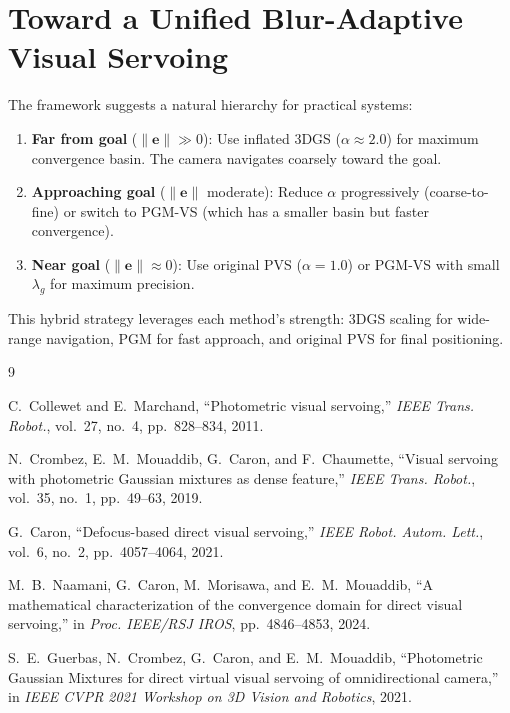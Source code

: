 \documentclass[11pt]{article}
\begin{document}
\section{Toward a Unified Blur-Adaptive Visual Servoing}

The framework suggests a natural hierarchy for practical systems:

\begin{enumerate}
    \item \textbf{Far from goal} ($\|\mathbf{e}\| \gg 0$): Use inflated 3DGS ($\alpha \approx 2.0$) for maximum convergence basin. The camera navigates coarsely toward the goal.

    \item \textbf{Approaching goal} ($\|\mathbf{e}\|$ moderate): Reduce $\alpha$ progressively (coarse-to-fine) or switch to PGM-VS (which has a smaller basin but faster convergence).

    \item \textbf{Near goal} ($\|\mathbf{e}\| \approx 0$): Use original PVS ($\alpha = 1.0$) or PGM-VS with small $\lambda_g$ for maximum precision.
\end{enumerate}

This hybrid strategy leverages each method's strength: 3DGS scaling for wide-range navigation, PGM for fast approach, and original PVS for final positioning.


\begin{thebibliography}{9}

C.~Collewet and E.~Marchand,
``Photometric visual servoing,''
\emph{IEEE Trans. Robot.}, vol.~27, no.~4, pp.~828--834, 2011.

N.~Crombez, E.~M.~Mouaddib, G.~Caron, and F.~Chaumette,
``Visual servoing with photometric Gaussian mixtures as dense feature,''
\emph{IEEE Trans. Robot.}, vol.~35, no.~1, pp.~49--63, 2019.

G.~Caron,
``Defocus-based direct visual servoing,''
\emph{IEEE Robot. Autom. Lett.}, vol.~6, no.~2, pp.~4057--4064, 2021.

M.~B.~Naamani, G.~Caron, M.~Morisawa, and E.~M.~Mouaddib,
``A mathematical characterization of the convergence domain for direct visual servoing,''
in \emph{Proc. IEEE/RSJ IROS}, pp.~4846--4853, 2024.

S.~E.~Guerbas, N.~Crombez, G.~Caron, and E.~M.~Mouaddib,
``Photometric Gaussian Mixtures for direct virtual visual servoing of omnidirectional camera,''
in \emph{IEEE CVPR 2021 Workshop on 3D Vision and Robotics}, 2021.

\end{thebibliography}
\end{document}
